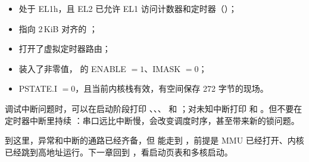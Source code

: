 \begin{itemize}
  \item 处于 EL1h，且 EL2 已允许 EL1 访问计数器和定时器（）；
  \item {} 指向 2\,KiB 对齐的 ；
  \item {} 打开了虚拟定时器路由；
  \item {} 装入了非零值， 的 ENABLE $=1$、IMASK $=0$；
  \item PSTATE.I $=0$，且当前内核栈有效，有空间保存 272 字节的现场。
\end{itemize}

调试中断问题时，可以在启动阶段打印 、、、 和 ；对未知中断打印  和 。但不要在定时器中断里持续 ：串口远比中断慢，会改变调度时序，甚至带来新的锁问题。

到这里，异常和中断的通路已经齐备，但  能走到 ，前提是 MMU 已经打开、内核已经跳到高地址运行。下一章回到 ，看启动页表和多核启动。

